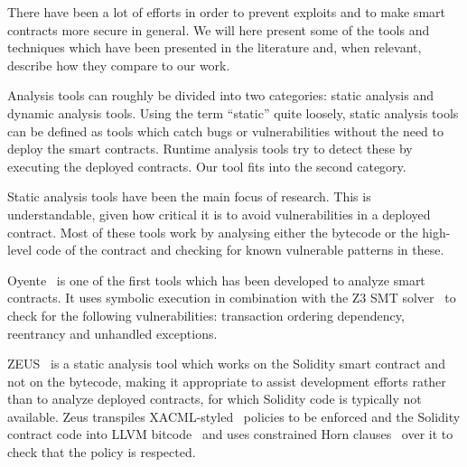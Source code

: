 

There have been a lot of efforts in order to prevent exploits and to make smart contracts more secure in general.
We will here present some of the tools and techniques which have been presented in the literature and, when relevant, describe how they compare to our work.

Analysis tools can roughly be divided into two categories: static analysis and dynamic analysis tools.
Using the term ``static'' quite loosely, static analysis tools can be defined as tools which catch bugs or vulnerabilities without the need to deploy the smart contracts.
Runtime analysis tools try to detect these by executing the deployed contracts.
Our tool fits into the second category.

 Static analysis tools have been the main focus of research.
This is understandable, given how critical it is to avoid vulnerabilities in a deployed contract.
Most of these tools work by analysing either the bytecode or the high-level code of the contract and checking for known vulnerable patterns in these.

Oyente~\cite{luu2016a} is one of the first tools which has been developed to analyze smart contracts.
It uses symbolic execution in combination with the Z3 SMT solver~\cite{de2008z3} to check for the following vulnerabilities: transaction ordering dependency, reentrancy and unhandled exceptions.

ZEUS~\cite{DBLP:conf/ndss/KalraGDS18} is a static analysis tool which works on the Solidity smart contract and not on the bytecode, making it appropriate to assist development efforts rather than to analyze deployed contracts, for which Solidity code is typically not available.
Zeus transpiles XACML-styled~\cite{XACML} policies to be enforced and the Solidity contract code into LLVM bitcode~\cite{lattner2004llvm} and uses constrained Horn clauses~\cite{bjorner2012program,mcmillan2007interpolants} over it to check that the policy is respected.

